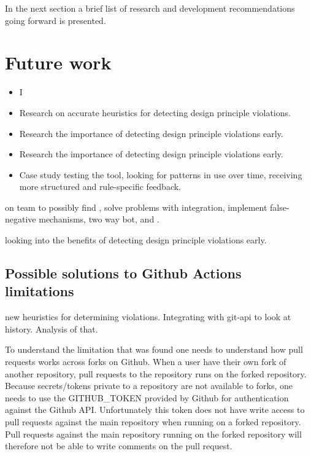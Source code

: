 \documentclass{report}
\begin{document}
In the next section a brief list of research and development recommendations going forward is presented. 

\section{Future work}

\begin{itemize}
    \item I
    \item Research on accurate heuristics for detecting design principle violations. 
    \item Research the importance of detecting design principle violations early.
    \item Research the importance of detecting design principle violations early.
    \item Case study testing the tool, looking for patterns in use over time, receiving more structured and rule-specific feedback. 
\end{itemize}


on team to possibly find , solve problems with integration, implement false-negative mechanisms, two way bot, and . 

looking into the benefits of detecting design principle violations early.



\subsection{Possible solutions to Github Actions limitations}
new heuristics for determining violations. Integrating with git-api to look at history. Analysis of that.

\label{possible-solutions}
To understand the limitation that was found one needs to understand how pull requests works across forks on Github. When a user have their own fork of another repository, pull requests to the repository runs on the forked repository. Because secrets/tokens private to a repository are not available to forks, one needs to use the GITHUB\_TOKEN provided by Github for authentication against the Github API. Unfortunately this token does not have write access to pull requests against the main repository when running on a forked repository. Pull requests against the main repository running on the forked repository will therefore not be able to write comments on the pull request.
\end{document}
